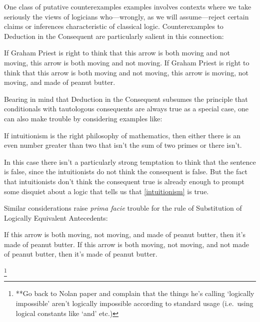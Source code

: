 \documentclass[If.tex]{subfiles}
\begin{document}
One class of putative counterexamples examples involves contexts where we take seriously the views of logicians who---wrongly, as we will assume---reject certain claims or inferences characteristic of classical logic.  Counterexamples to Deduction in the Consequent are particularly salient in this connection:
\begin{prop}
	\nitem \label{priest}
	\begin{prop}
		\aitem
		If Graham Priest is right to think that this arrow is both moving and not moving, this arrow is both moving and not moving.
		\aitem
		If Graham Priest is right to think that this arrow is both moving and not moving, this arrow is moving, not moving, and made of peanut butter.
	\end{prop}
\end{prop}
Bearing in mind that Deduction in the Consequent subsumes the principle that conditionals with tautologous consequents are always true as a special case, one can also make trouble by considering examples like:
\begin{prop}
	\nitem \label{intuitionism}
	If intuitionism is the right philosophy of mathematics, then either there is an even number greater than two that isn't the sum of two primes or there isn't. 
\end{prop}
In this case there isn't a particularly strong temptation to think that the sentence is false, since the intuitionists do not think the consequent is false.  But the fact that intuitionists don't think the consequent true is already enough to prompt some disquiet about a logic that tells us that \ref{intuitionism} is true.  

Similar considerations raise \emph{prima facie} trouble for the rule of Substitution of Logically Equivalent Antecedents:
\begin{prop}
	\nitem
	\begin{prop}
		\aitem
		If this arrow is both moving, not moving, and made of peanut butter, then it's made of peanut butter.  
		\aitem
		If this arrow is both moving, not moving, and not made of peanut butter, then it's made of peanut butter.  
	\end{prop}
\end{prop}
\footnote{**Go back to Nolan paper and complain that the things he's calling ‘logically impossible’ aren't logically impossible according to standard usage (i.e.\ using logical constants like ‘and’ etc.)}
\end{document}
